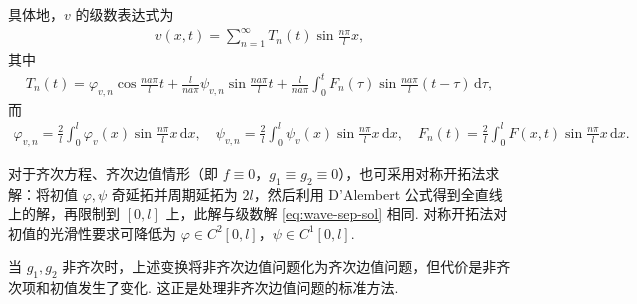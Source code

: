 \documentclass[../../main.tex]{subfiles}%
\begin{document}
\begin{theorem}
具体地，$v$ 的级数表达式为
\begin{align}
v(x,t)=\sum_{n=1}^{\infty}T_n(t)\sin\frac{n\pi}{l}x, \label{eq:v-series}
\end{align}
其中
\begin{align}
T_n(t)=\varphi_{v,n}\cos\frac{na\pi}{l}t+\frac{l}{na\pi}\psi_{v,n}\sin\frac{na\pi}{l}t +\frac{l}{na\pi}\int_0^t F_n(\tau)\sin\frac{na\pi}{l}(t-\tau)\,\mathrm{d}\tau, \label{eq:Tn-bc}
\end{align}
而
\begin{align}
\varphi_{v,n}=\frac{2}{l}\int_0^l\varphi_v(x)\sin\frac{n\pi}{l}x\,\mathrm{d}x,\quad
\psi_{v,n}=\frac{2}{l}\int_0^l\psi_v(x)\sin\frac{n\pi}{l}x\,\mathrm{d}x,\quad
F_n(t)=\frac{2}{l}\int_0^l F(x,t)\sin\frac{n\pi}{l}x\,\mathrm{d}x. \label{eq:coeff-v}
\end{align}
\end{theorem}
\begin{remark}
对于齐次方程、齐次边值情形（即 $f\equiv 0$，$g_1\equiv g_2\equiv 0$），也可采用对称开拓法求解：将初值 $\varphi,\psi$ 奇延拓并周期延拓为 $2l$，然后利用 D'Alembert 公式得到全直线上的解，再限制到 $[0,l]$ 上，此解与级数解 \eqref{eq:wave-sep-sol} 相同. 对称开拓法对初值的光滑性要求可降低为 $\varphi\in C^2[0,l]$，$\psi\in C^1[0,l]$.
\end{remark}
\begin{remark}
当 $g_1,g_2$ 非齐次时，上述变换将非齐次边值问题化为齐次边值问题，但代价是非齐次项和初值发生了变化. 这正是处理非齐次边值问题的标准方法.
\end{remark}
\end{document}
